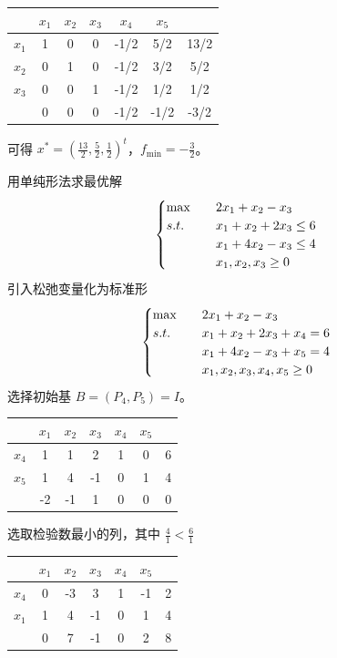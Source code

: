 \begin{example}
\begin{center}
        \begin{tabular}{c|ccccc|c}
            & $x_1$ & $x_2$ & $x_3$ & $x_4$ & $x_5$ & \\
            \hline
            $x_1$ & 1 & 0 & 0 & -1/2 & 5/2 & 13/2\\
            $x_2$ & 0 & 1 & 0 & -1/2 & 3/2 & 5/2\\
            $x_3$ & 0 & 0 & 1 & -1/2 & 1/2 & 1/2\\
            \hline
             & 0 & 0 & 0 & -1/2 & -1/2 & -3/2
        \end{tabular}
    \end{center}
    可得 $x^* = \left(\frac{13}{2}, \frac{5}{2}, \frac{1}{2}\right)^t$，$f_{\min} = -\frac{3}{2}$。
\end{example}

\begin{example}
    用单纯形法求最优解
    \[
        \begin{cases}
            \max \quad &2x_1 + x_2 - x_3\\
            s.t. \quad &x_1 + x_2 + 2x_3 \le 6\\
            &x_1 + 4x_2 - x_3 \le 4\\
            &x_1, x_2, x_3 \ge 0
        \end{cases}    
    \]
    引入松弛变量化为标准形
    \[
        \begin{cases}
            \max \quad &2x_1 + x_2 - x_3\\
            s.t. \quad &x_1 + x_2 + 2x_3 + x_4 = 6\\
            &x_1 + 4x_2 - x_3 + x_5 = 4\\
            &x_1, x_2, x_3, x_4, x_5 \ge 0
        \end{cases}    
    \]
    选择初始基 $B = (P_4, P_5) = I$。
    \begin{center}
        \begin{tabular}{c|ccccc|c}
            & $x_1$ & $x_2$ & $x_3$ & $x_4$ & $x_5$ & \\
            \hline
            $x_4$ & 1 & 1 & 2 &1 & 0 & 6\\
            $x_5$ & {\color{red} 1} & 4 & -1 & 0 & 1 & 4\\
            \hline
             & -2 & -1 & 1 & 0 & 0 & 0
        \end{tabular}

        选取检验数最小的列，其中 $\frac{4}{1} < \frac{6}{1}$

        \begin{tabular}{c|ccccc|c}
            & $x_1$ & $x_2$ & $x_3$ & $x_4$ & $x_5$ & \\
            \hline
            $x_4$ & 0 & -3 & {\color{red}3} & 1 & -1 & 2\\
            $x_1$ & 1 & 4 & -1 & 0 & 1 & 4\\
            \hline
             & 0 & 7 & -1 & 0 & 2 & 8
        \end{tabular}


\end{center}
\end{example}
